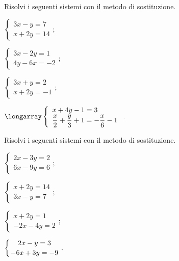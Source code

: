 \begin{esercizio}[\Ast]
 \label{ese:21.9}
Risolvi i seguenti sistemi con il metodo di sostituzione.
 \begin{multicols}{2}
 \begin{enumeratea}
  \item $\left\{\begin{array}{l}3x-y=7\\x+2y=14\end{array}\right.;$
\item $\left\{\begin{array}{l}3x-2y=1\\4y-6x=-2\end{array}\right.;$
\item $\left\{\begin{array}{l}3x+y=2\\x+2y=-1\end{array}\right.;$
\item ${\longarray\left\{\begin{array}{l}x+4y-1=3\\
	\dfrac{x}{2}+\dfrac{y}{3}+1=-{\dfrac{x}{6}}-1
	\end{array}\right..}$
 \end{enumeratea}
 \end{multicols}
\end{esercizio}

\begin{esercizio}[\Ast]
 \label{ese:21.10}
Risolvi i seguenti sistemi con il metodo di sostituzione.
 \begin{multicols}{2}
 \begin{enumeratea}
  \item $\left\{\begin{array}{l}2x-3y=2\\6x-9y=6\end{array}\right.;$
\item $\left\{\begin{array}{l}x+2y=14\\3x-y=7\end{array}\right.;$
\item $\left\{\begin{array}{l}x+2y=1\\-2x-4y=2\end{array}\right.;$
\item $\left\{\genfrac{}{}{0pt}{0}{2x-y=3}{-6x+3y=-9}\right..$
 \end{enumeratea}
 \end{multicols}
\end{esercizio}

